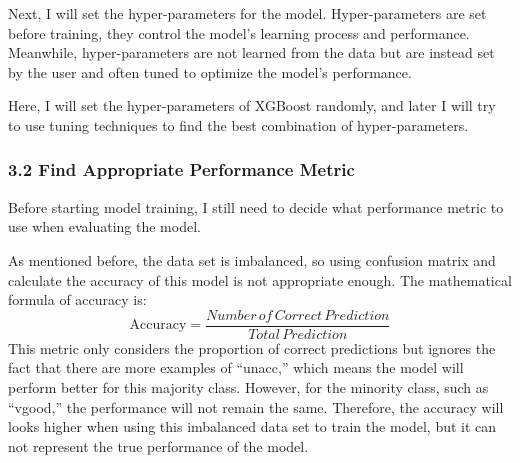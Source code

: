 \documentclass[
]{article}
\newenvironment{Shaded}{\begin{snugshade}}{\end{snugshade}}
\newcommand{\AttributeTok}[1]{\textcolor[rgb]{0.13,0.29,0.53}{#1}}
\newcommand{\CommentTok}[1]{\textcolor[rgb]{0.56,0.35,0.01}{\textit{#1}}}
\newcommand{\DecValTok}[1]{\textcolor[rgb]{0.00,0.00,0.81}{#1}}
\newcommand{\FloatTok}[1]{\textcolor[rgb]{0.00,0.00,0.81}{#1}}
\newcommand{\FunctionTok}[1]{\textcolor[rgb]{0.13,0.29,0.53}{\textbf{#1}}}
\newcommand{\NormalTok}[1]{#1}
\newcommand{\OtherTok}[1]{\textcolor[rgb]{0.56,0.35,0.01}{#1}}
\newcommand{\SpecialCharTok}[1]{\textcolor[rgb]{0.81,0.36,0.00}{\textbf{#1}}}
\newcommand{\StringTok}[1]{\textcolor[rgb]{0.31,0.60,0.02}{#1}}
\begin{document}
Next, I will set the hyper-parameters for the model. Hyper-parameters
are set before training, they control the model's learning process and
performance. Meanwhile, hyper-parameters are not learned from the data
but are instead set by the user and often tuned to optimize the model's
performance.

Here, I will set the hyper-parameters of XGBoost randomly, and later I
will try to use tuning techniques to find the best combination of
hyper-parameters.

\begin{Shaded}
\end{Shaded}

\subsubsection{3.2 Find Appropriate Performance
Metric}\label{find-appropriate-performance-metric}

Before starting model training, I still need to decide what performance
metric to use when evaluating the model.

As mentioned before, the data set is imbalanced, so using confusion
matrix and calculate the accuracy of this model is not appropriate
enough. The mathematical formula of accuracy is: \[
\text{Accuracy} = \frac{Number\,of\,Correct\,Prediction}{Total\,Prediction}
\] This metric only considers the proportion of correct predictions but
ignores the fact that there are more examples of ``unacc,'' which means
the model will perform better for this majority class. However, for the
minority class, such as ``vgood,'' the performance will not remain the
same. Therefore, the accuracy will looks higher when using this
imbalanced data set to train the model, but it can not represent the
true performance of the model.
\end{document}
